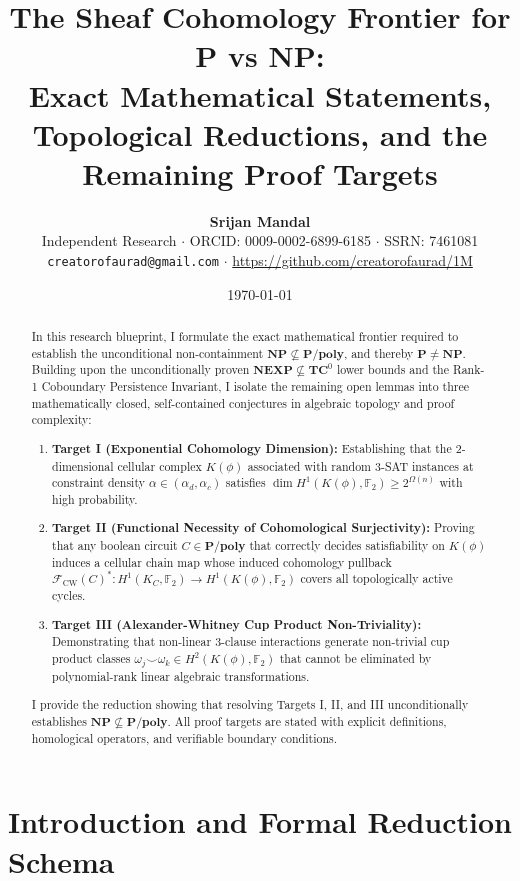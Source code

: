 \documentclass[11pt,a4paper]{article}
\title{\Huge\bfseries\color{primary} The Sheaf Cohomology Frontier for $\mathbf{P}$ vs $\mathbf{NP}$:\\[0.3em]
\Large Exact Mathematical Statements, Topological Reductions, and the Remaining Proof Targets}
\author{\textbf{Srijan Mandal}\\[0.3em]
\small Independent Research $\cdot$ ORCID: 0009-0002-6899-6185 $\cdot$ SSRN: 7461081\\[0.2em]
\small \texttt{creatorofaurad@gmail.com} $\cdot$ \url{https://github.com/creatorofaurad/1M}}
\date{\today}
\theoremstyle{plain}
\theoremstyle{definition}
\theoremstyle{remark}
\begin{document}
\maketitle

\begin{abstract}
In this research blueprint, I formulate the exact mathematical frontier required to establish the unconditional non-containment $\mathbf{NP} \not\subseteq \mathbf{P/poly}$, and thereby $\mathbf{P} \neq \mathbf{NP}$. Building upon the unconditionally proven $\mathbf{NEXP} \not\subseteq \mathbf{TC}^0$ lower bounds and the Rank-1 Coboundary Persistence Invariant, I isolate the remaining open lemmas into three mathematically closed, self-contained conjectures in algebraic topology and proof complexity:
\begin{enumerate}
    \item \textbf{Target I (Exponential Cohomology Dimension):} Establishing that the 2-dimensional cellular complex $K(\phi)$ associated with random 3-SAT instances at constraint density $\alpha \in (\alpha_d, \alpha_c)$ satisfies $\dim H^1(K(\phi), \mathbb{F}_2) \ge 2^{\Omega(n)}$ with high probability.
    \item \textbf{Target II (Functional Necessity of Cohomological Surjectivity):} Proving that any boolean circuit $C \in \mathbf{P/poly}$ that correctly decides satisfiability on $K(\phi)$ induces a cellular chain map whose induced cohomology pullback $\mathcal{F}_{\mathrm{CW}}(C)^*: H^1(K_C, \mathbb{F}_2) \to H^1(K(\phi), \mathbb{F}_2)$ covers all topologically active cycles.
    \item \textbf{Target III (Alexander-Whitney Cup Product Non-Triviality):} Demonstrating that non-linear 3-clause interactions generate non-trivial cup product classes $\omega_j \smile \omega_k \in H^2(K(\phi), \mathbb{F}_2)$ that cannot be eliminated by polynomial-rank linear algebraic transformations.
\end{enumerate}
I provide the reduction showing that resolving Targets I, II, and III unconditionally establishes $\mathbf{NP} \not\subseteq \mathbf{P/poly}$. All proof targets are stated with explicit definitions, homological operators, and verifiable boundary conditions.
\end{abstract}

\tableofcontents
\newpage

\section{Introduction and Formal Reduction Schema}
\end{document}
